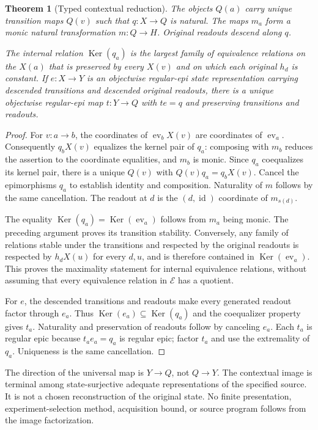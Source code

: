 \documentclass[11pt]{article}
\newtheorem{theorem}{Theorem}[section]
\theoremstyle{definition}
\theoremstyle{remark}\newtheorem{remark}[theorem]{Remark}
\newcommand{\E}{\mathcal E}
\newcommand{\id}{\operatorname{id}}
\newcommand{\Ker}{\operatorname{Ker}}
\newcommand{\ev}{\operatorname{ev}}
\begin{document}
\begin{theorem}[Typed contextual reduction]\label{g:thm:reduction}
The objects $Q(a)$ carry unique transition maps $Q(v)$ such that
$q:X\to Q$ is natural. The maps $m_a$ form a monic natural transformation
$m:Q\to H$. Original readouts descend along $q$.

The internal relation $\Ker(q_a)$ is the largest family of equivalence
relations on the $X(a)$ that is preserved by every $X(v)$ and on which
each original $h_d$ is constant. If $e:X\to Y$ is an objectwise regular-epi
state representation carrying descended transitions and descended original
readouts, there is a unique objectwise regular-epi map $t:Y\to Q$ with $te=q$ and preserving
transitions and readouts.
\end{theorem}
\begin{proof}
For $v:a\to b$, the coordinates of $\ev_bX(v)$ are coordinates of $\ev_a$.
Consequently $q_bX(v)$ equalizes the kernel pair of $q_a$: composing with
$m_b$ reduces the assertion to the coordinate equalities, and $m_b$ is
monic. Since $q_a$ coequalizes its kernel pair, there is a unique
$Q(v)$ with $Q(v)q_a=q_bX(v)$. Cancel the epimorphisms $q_a$ to establish
identity and composition. Naturality of $m$ follows by the same cancellation.
The readout at $d$ is the $(d,\id)$ coordinate of $m_{s(d)}$.

The equality $\Ker(q_a)=\Ker(\ev_a)$ follows from $m_a$ being monic.
The preceding argument proves its transition stability. Conversely, any
family of relations stable under the transitions and respected by the
original readouts is respected by $h_dX(u)$ for every $d,u$, and is therefore
contained in $\Ker(\ev_a)$. This proves the maximality statement for
internal equivalence relations, without assuming that every equivalence
relation in $\E$ has a quotient.

For $e$, the descended transitions and readouts make every generated readout
factor through $e_a$. Thus $\Ker(e_a)\subseteq\Ker(q_a)$ and the
coequalizer property gives $t_a$. Naturality and preservation of readouts
follow by canceling $e_a$. Each $t_a$ is regular epic because $t_ae_a=q_a$
is regular epic; factor $t_a$ and use the extremality of $q_a$.
Uniqueness is the same cancellation.
\end{proof}

The direction of the universal map is $Y\to Q$, not $Q\to Y$.
The contextual image is terminal among state-surjective adequate
representations of the specified source. It is not a chosen reconstruction
of the original state. No finite presentation, experiment-selection method,
acquisition bound, or source program follows from the image factorization.
\end{document}
